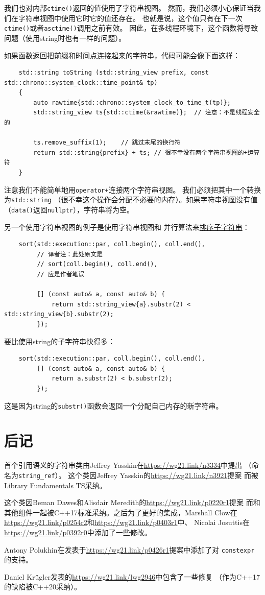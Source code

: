 我们也对内部\texttt{ctime()}返回的值使用了字符串视图。
然而，我们必须小心保证当我们在字符串视图中使用它时它的值还存在。
也就是说，这个值只有在下一次\texttt{ctime()}或者\texttt{asctime()}调用之前有效。
因此，在多线程环境下，这个函数将导致问题（使用string时也有一样的问题）。

如果函数返回把前缀和时间点连接起来的字符串，代码可能会像下面这样：
\begin{lstlisting}
    std::string toString (std::string_view prefix, const std::chrono::system_clock::time_point& tp)
    {
        auto rawtime{std::chrono::system_clock_to_time_t(tp)};
        std::string_view ts{std::ctime(&rawtime)};  // 注意：不是线程安全的

        ts.remove_suffix(1);    // 跳过末尾的换行符
        return std::string{prefix} + ts; // 很不幸没有两个字符串视图的+运算符
    }
\end{lstlisting}
注意我们不能简单地用\texttt{operator+}连接两个字符串视图。
我们必须把其中一个转换为\texttt{std::string}
（很不幸这个操作会分配不必要的内存）。如果字符串视图没有值
（\texttt{data()}返回\texttt{nullptr}），字符串将为空。

另一个使用字符串视图的例子是使用字符串视图和
并行算法来\hyperref[{ch22.1.2.1}]{排序子字符串}：
\begin{lstlisting}
    sort(std::execution::par, coll.begin(), coll.end(),
         // 译者注：此处原文是
         // sort(coll.begin(), coll.end(),
         // 应是作者笔误

         [] (const auto& a, const auto& b) {
             return std::string_view{a}.substr(2) < std::string_view{b}.substr(2);
         });
\end{lstlisting}
要比使用string的子字符串快得多：
\begin{lstlisting}
    sort(std::execution::par, coll.begin(), coll.end(),
         [] (const auto& a, const auto& b) {
             return a.substr(2) < b.substr(2);
         });
\end{lstlisting}
这是因为string的\texttt{substr()}函数会返回一个分配自己内存的新字符串。


\section{后记}
首个引用语义的字符串类由Jeffrey Yasskin在\url{https://wg21.link/n3334}中提出
（命名为\texttt{string\_ref}）。
这个类因Jeffrey Yasskin的\url{https://wg21.link/n3921}提案
而被Library Fundamentals TS采纳。

这个类因Beman Dawes和Alisdair Meredith的\url{https://wg21.link/p0220r1}提案
而和其他组件一起被C++17标准采纳。之后为了更好的集成，Marshall Clow在
\url{https://wg21.link/p0254r2}和\url{https://wg21.link/p0403r1}中、
Nicolai Josuttis在\url{https://wg21.link/p0392r0}中添加了一些修改。

Antony Polukhin在发表于\url{https://wg21.link/p0426r1}提案中添加了对
\texttt{constexpr}的支持。

Daniel Krügler发表的\url{https://wg21.link/lwg2946}中包含了一些修复
（作为C++17的缺陷被C++20采纳）。